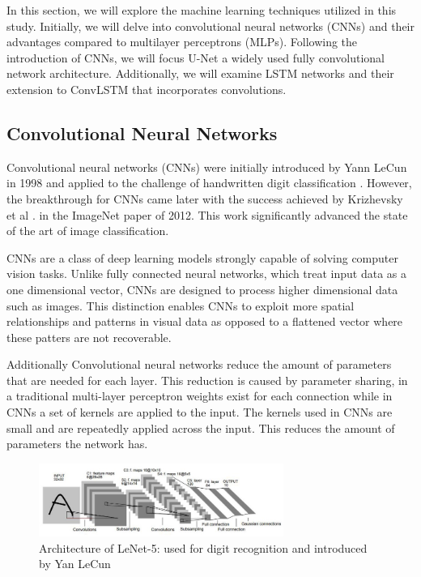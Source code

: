 In this section, we will explore the machine learning techniques utilized
in this study. Initially, we will delve into convolutional neural networks
(CNNs) and their advantages compared to multilayer perceptrons (MLPs).
Following the introduction of CNNs, we will focus U-Net a widely used fully convolutional network architecture.
Additionally, we will examine LSTM networks and their extension to ConvLSTM that incorporates convolutions.
\medskip

\subsection{Convolutional Neural Networks}

Convolutional neural networks (CNNs) were initially introduced by Yann LeCun in 1998 and applied to the challenge of handwritten digit classification \cite{lecun-1998}. However, the breakthrough for CNNs came later with the success achieved by Krizhevsky et al \cite{krizhevsky-2017}. in the ImageNet paper of 2012.
This work significantly advanced the state of the art of image classification.

CNNs are a class of deep learning models strongly capable of solving computer vision tasks. Unlike fully connected neural networks, which treat input data as a one dimensional vector, CNNs are designed to process higher dimensional data such as images.
This distinction enables CNNs to exploit more spatial relationships and patterns in visual data as opposed to a flattened vector where these patters are not recoverable.

Additionally Convolutional neural networks reduce the amount of parameters that are needed for each layer. This reduction is caused by parameter sharing, in a
traditional multi-layer perceptron weights exist for each connection while in CNNs a set of kernels are applied to the input. The kernels used in CNNs are small and are repeatedly applied across the input.
This reduces the amount of parameters the network has. 

\begin{figure}
  \includegraphics[width=8cm]{../images/cun.jpeg}
  \caption[short]{Architecture of LeNet-5: used for digit recognition and introduced by Yan LeCun \cite{lecun-1998}}
\end{figure}

